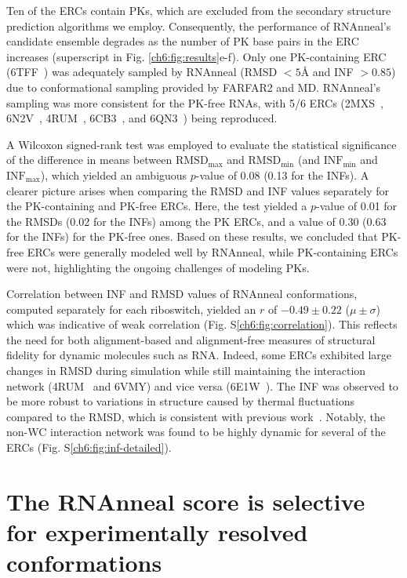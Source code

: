 Ten of the ERCs contain PKs, which are excluded from the secondary structure prediction algorithms we employ. Consequently, the performance of RNAnneal's candidate ensemble degrades as the number of PK base pairs in the ERC increases (superscript in Fig. \ref{ch6:fig:results}e-f). Only one PK-containing ERC (6TFF~\cite{Huang2020}) was adequately sampled by RNAnneal (RMSD $<5${\AA} and INF $>0.85$) due to conformational sampling provided by FARFAR2 and MD. RNAnneal's sampling was more consistent for the PK-free RNAs, with 5/6 ERCs (2MXS~\cite{Schmidtke2015}, 6N2V~\cite{Price2018}, 4RUM~\cite{Ramesh2014}, 6CB3~\cite{Bachas2018}, and 6QN3~\cite{Huang2019}) being reproduced.

A Wilcoxon signed-rank test was employed to evaluate the statistical significance of the difference in means between $\mathrm{RMSD}_\mathrm{max}$ and $\mathrm{RMSD}_\mathrm{min}$ (and $\mathrm{INF}_\mathrm{min}$ and $\mathrm{INF}_\mathrm{max}$), which yielded an ambiguous $p$-value of 0.08 (0.13 for the INFs). A clearer picture arises when comparing the RMSD and INF values separately for the PK-containing and PK-free ERCs. Here, the test yielded a $p$-value of 0.01 for the RMSDs (0.02 for the INFs) among the PK ERCs, and a value of 0.30 (0.63 for the INFs) for the PK-free ones. Based on these results, we concluded that PK-free ERCs were generally modeled well by RNAnneal, while PK-containing ERCs were not, highlighting the ongoing challenges of modeling PKs.

Correlation between INF and RMSD values of RNAnneal conformations, computed separately for each riboswitch, yielded an $r$ of $-0.49\pm0.22$ ($\mu\pm\sigma$) which was indicative of weak correlation (Fig. S\ref{ch6:fig:correlation}). This reflects the need for both alignment-based and alignment-free measures of structural fidelity for dynamic molecules such as RNA. Indeed, some ERCs exhibited large changes in RMSD during simulation while still maintaining the interaction network (4RUM~\cite{Ramesh2014} and 6VMY) and vice versa (6E1W~\cite{Numata2019}). The INF was observed to be more robust to variations in structure caused by thermal fluctuations compared to the RMSD, which is consistent with previous work~\cite{parisien2009new}. Notably, the non-WC interaction network was found to be highly dynamic for several of the ERCs (Fig. S\ref{ch6:fig:inf-detailed}).

\section{The RNAnneal score is selective for experimentally resolved conformations}

